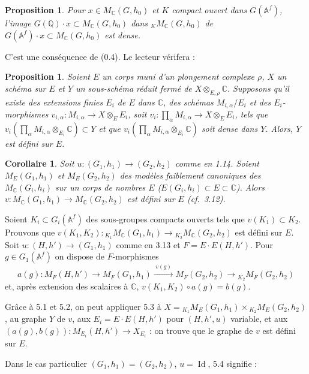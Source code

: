 \documentclass[11pt]{amsart}
\theoremstyle{plain}
\newtheorem{proposition}[theorem]{Proposition}
\newtheorem{corollary}[theorem]{Corollaire}
\theoremstyle{definition}
\DeclareMathOperator{\Id}{Id}
\newcommand{\QQ}{\mathbb{Q}}
\newcommand{\CC}{\mathbb{C}}
\newcommand{\AAf}{\mathbb{A}^f}
\newcommand{\MC}{M_{\mathbb{C}}}
\begin{document}
\begin{proposition}
Pour $x \in \MC(G,h_0)$ et $K$ compact ouvert dans $G(\AAf)$, l'image $G(\QQ) \cdot x \subset \MC(G,h_0)$ dans ${}_K \MC(G,h_0)$ de $G(\AAf) \cdot x \subset \MC(G,h_0)$ est dense.
\end{proposition}

C'est une cons\'equence de (0.4). Le lecteur v\'erifera :

\begin{proposition}
Soient $E$ un corps muni d'un plongement complexe $\rho$, $X$ un sch\'ema sur $E$ et $Y$ un sous-sch\'ema r\'eduit ferm\'e de $X \otimes_{E,\rho} \CC$. Supposons qu'il existe des extensions finies $E_i$ de $E$ dans $\CC$, des sch\'emas $M_{i,\alpha}/E_i$ et des $E_i$-morphismes $v_{i,\alpha} : M_{i,\alpha} \to X \otimes_E E_i$, soit $v_i : \prod_\alpha M_{i,\alpha} \to X \otimes_E E_i$, tels que $v_i(\prod_\alpha M_{i,\alpha} \otimes_{E_i} \CC) \subset Y$ et que $v_i(\prod_\alpha M_{i,\alpha} \otimes_{E_i} \CC)$ soit dense dans $Y$. Alors, $Y$ est d\'efini sur $E$.
\end{proposition}

\begin{corollary}
Soit $u : (G_1, h_1) \to (G_2, h_2)$ comme en 1.14. Soient $M_E(G_1, h_1)$ et $M_E(G_2, h_2)$ des mod\`eles faiblement canoniques des $\MC(G_i, h_i)$ sur un corps de nombres $E$ ($E(G_i, h_i) \subset E \subset \CC$). Alors $v : \MC(G_1, h_1) \to \MC(G_2, h_2)$ est d\'efini sur $E$ (cf.\ 3.12).
\end{corollary}

Soient $K_i \subset G_i(\AAf)$ des sous-groupes compacts ouverts tels que $v(K_1) \subset K_2$. Prouvons que $v(K_1, K_2) : {}_{K_1} \MC(G_1, h_1) \to {}_{K_2} \MC(G_2, h_2)$ est d\'efini sur $E$. Soit $u : (H,h') \to (G_1, h_1)$ comme en 3.13 et $F = E \cdot E(H,h')$. Pour $g \in G_1(\AAf)$ on dispose de $F$-morphismes
\[
a(g) : M_F(H,h') \longrightarrow M_F(G_1, h_1) \xrightarrow{\;v(g)\;} M_F(G_2, h_2) \longrightarrow {}_{K_2} M_F(G_2, h_2)
\]
et, apr\`es extension des scalaires \`a $\CC$, $v(K_1, K_2) \circ a(g) = b(g)$.

Gr\^ace \`a 5.1 et 5.2, on peut appliquer 5.3 \`a $X = {}_{K_1} M_E(G_1, h_1) \times {}_{K_2} M_E(G_2, h_2)$, au graphe $Y$ de $v$, aux $E_i = E \cdot E(H,h')$ pour $(H,h',u)$ variable, et aux $(a(g), b(g)) : M_{E_i}(H,h') \to X_{E_i}$ : on trouve que le graphe de $v$ est d\'efini sur $E$.

Dans le cas particulier $(G_1, h_1) = (G_2, h_2)$, $u = \Id$, 5.4 signifie :
\end{document}
